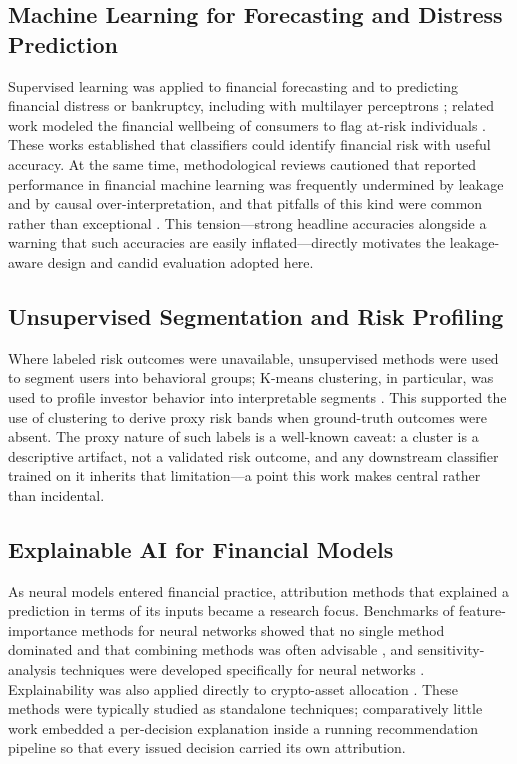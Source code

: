 \subsection{Machine Learning for Forecasting and Distress Prediction}\label{subsec:forecasting}
Supervised learning was applied to financial forecasting and to predicting financial
distress or bankruptcy, including with multilayer perceptrons \cite{ref3,ref18,ref19};
related work modeled the financial wellbeing of consumers to flag at-risk individuals
\cite{ref7}. These works established that classifiers could identify financial risk
with useful accuracy. At the same time, methodological reviews cautioned that reported
performance in financial machine learning was frequently undermined by leakage and by
causal over-interpretation, and that pitfalls of this kind were common rather than
exceptional \cite{ref4}. This tension---strong headline accuracies alongside a warning
that such accuracies are easily inflated---directly motivates the leakage-aware design
and candid evaluation adopted here.

\subsection{Unsupervised Segmentation and Risk Profiling}\label{subsec:segmentation}
Where labeled risk outcomes were unavailable, unsupervised methods were used to segment
users into behavioral groups; K-means clustering, in particular, was used to profile
investor behavior into interpretable segments \cite{ref20}. This supported the use of
clustering to derive proxy risk bands when ground-truth outcomes were absent. The proxy
nature of such labels is a well-known caveat: a cluster is a descriptive artifact, not a
validated risk outcome, and any downstream classifier trained on it inherits that
limitation---a point this work makes central rather than incidental.

\subsection{Explainable AI for Financial Models}\label{subsec:xai}
As neural models entered financial practice, attribution methods that explained a
prediction in terms of its inputs became a research focus. Benchmarks of
feature-importance methods for neural networks showed that no single method dominated
and that combining methods was often advisable \cite{ref10}, and sensitivity-analysis
techniques were developed specifically for neural networks \cite{ref21}. Explainability
was also applied directly to crypto-asset allocation \cite{ref12}. These methods were
typically studied as standalone techniques; comparatively little work embedded a
per-decision explanation inside a running recommendation pipeline so that every issued
decision carried its own attribution.

